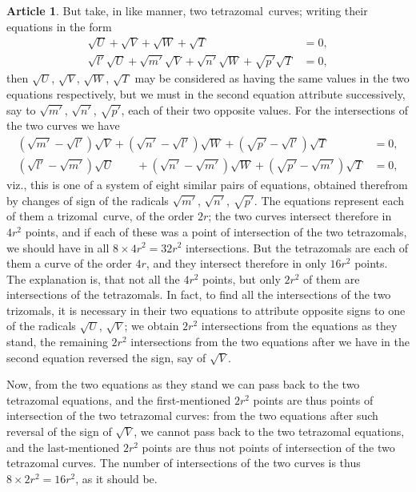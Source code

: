 \documentclass[11pt,a4paper]{article}
\theoremstyle{definition}
\newtheorem{art}{Article}
\newcommand{\trizomal}{trizomal}
\newcommand{\tetrazomal}{tetrazomal}
\begin{document}
\begin{art}
But take, in like manner, two \tetrazomal\ curves; writing their equations in the form
\begin{align*}
\sqrt{U} + \sqrt{V} + \sqrt{W} + \sqrt{T} &= 0, \\
\sqrt{l'}\sqrt{U} + \sqrt{m'}\sqrt{V} + \sqrt{n'}\sqrt{W} + \sqrt{p'}\sqrt{T} &= 0,
\end{align*}
then $\sqrt{U}$, $\sqrt{V}$, $\sqrt{W}$, $\sqrt{T}$ may be considered as having the same values in the two equations respectively, but we must in the second equation attribute successively, say to $\sqrt{m'}$, $\sqrt{n'}$, $\sqrt{p'}$, each of their two opposite values. For the intersections of the two curves we have
\begin{align*}
(\sqrt{m'} - \sqrt{l'})\sqrt{V} + (\sqrt{n'} - \sqrt{l'})\sqrt{W} + (\sqrt{p'} - \sqrt{l'})\sqrt{T} &= 0, \\
(\sqrt{l'} - \sqrt{m'})\sqrt{U} \quad\quad + (\sqrt{n'} - \sqrt{m'})\sqrt{W} + (\sqrt{p'} - \sqrt{m'})\sqrt{T} &= 0,
\end{align*}
viz., this is one of a system of eight similar pairs of equations, obtained therefrom by changes of sign of the radicals $\sqrt{m'}$, $\sqrt{n'}$, $\sqrt{p'}$. The equations represent each of them a \trizomal\ curve, of the order $2r$; the two curves intersect therefore in $4r^{2}$ points, and if each of these was a point of intersection of the two tetrazomals, we should have in all $8 \times 4r^{2} = 32r^{2}$ intersections. But the tetrazomals are each of them a curve of the order $4r$, and they intersect therefore in only $16r^{2}$ points. The explanation is, that not all the $4r^{2}$ points, but only $2r^{2}$ of them are intersections of the tetrazomals. In fact, to find all the intersections of the two trizomals, it is necessary in their two equations to attribute opposite signs to one of the radicals $\sqrt{U}$, $\sqrt{V}$; we obtain $2r^{2}$ intersections from the equations as they stand, the remaining $2r^{2}$ intersections from the two equations after we have in the second equation reversed the sign, say of $\sqrt{V}$.

Now, from the two equations as they stand we can pass back to the two tetrazomal equations, and the first-mentioned $2r^{2}$ points are thus points of intersection of the two tetrazomal curves: from the two equations after such reversal of the sign of $\sqrt{V}$, we cannot pass back to the two tetrazomal equations, and the last-mentioned $2r^{2}$ points are thus not points of intersection of the two tetrazomal curves. The number of intersections of the two curves is thus $8 \times 2r^{2} = 16r^{2}$, as it should be.
\end{art}
\end{document}
